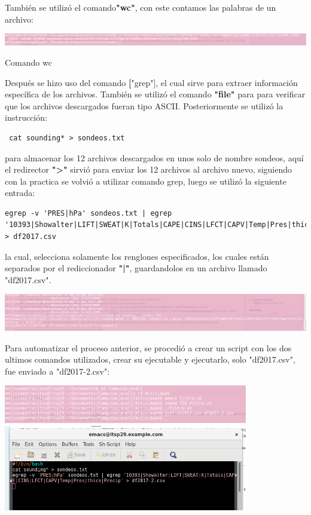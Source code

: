 \documentclass{article}
\begin{document}
También se utilizó el comando\textbf{"wc"}, con este contamos las palabras de un archivo:
\begin{center}
 \includegraphics[width=1\textwidth]{wc.png}

Comando wc

\end{center}

Después se hizo uso del comando \textbf["grep"], el cual sirve para extraer información específica de los archivos. También se utilizó el comando \textbf{"file"} para para verificar que los archivos descargados fueran tipo ASCII.
Posteriormente se utilizó la instrucción:
\begin{verbatim} cat sounding* > sondeos.txt
\end{verbatim}
para almacenar los 12 archivos descargados en unos solo de nombre sondeos, aquí el redirector \textbf{">"} sirvió para enviar los 12 archivos al archivo nuevo, siguiendo con la practica se volvió a utilizar comando grep, luego se utilizó la siguiente entrada:
\begin{verbatim}
egrep -v 'PRES|hPa' sondeos.txt | egrep '10393|Showalter|LIFT|SWEAT|K|Totals|CAPE|CINS|LFCT|CAPV|Temp|Pres|thick|Precip' > df2017.csv
\end{verbatim}
la cual, selecciona solamente los renglones especificados, los cuales están separados por el rediccionador \textbf{"|"}, guardandolos en un archivo llamado "df2017.csv".
\begin{center}
 \includegraphics[width=1\textwidth]{egrep.png}

\end{center}
 Para automatizar el proceso anterior, se procedió a crear un script con los dos ultimos comandos utilizados, crear su ejecutable y ejecutarlo, solo "df2017.csv", fue enviado a "df2017-2.csv":
 \begin{center}
 \includegraphics[width=0.8\textwidth]{egrepa.png}
\includegraphics[width=0.8\textwidth]{egrepa2.png}
\end{center}
\end{document}
